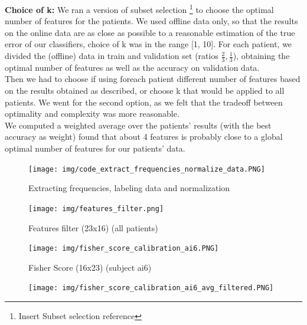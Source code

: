 \begin{itemize}
\textbf{Choice of k:} We ran a version of subset selection \footnote{Insert Subset selection reference} to choose the optimal number of features for the patients. We used offline data only, so that the results on the online data are as close as possible to a reasonable estimation of the true error of our classifiers, choice of k was in the range [1, 10]. For each patient, we divided the (offline) data in train and validation set (ratios $\frac{2}{3}, \frac{1}{3}$), obtaining the optimal number of features as well as the accuracy on validation data. \\
Then we had to choose if using foreach patient different number of features based on the results obtained as described, or choose k that would be applied to all patients. We went for the second option, as we felt that the tradeoff between optimality and complexity was more reasonable. \\
We computed a weighted average over the patients' results (with the best accuracy as weight) found that about 4 features is probably close to a global optimal number of features for our patients' data.

\begin{figure}[h!]
	\begin{center}
		 \texttt{[image: img/code\_extract\_frequencies\_normalize\_data.PNG]}
	\end{center}

	 \caption{Extracting frequencies, labeling data and normalization}
	 \label{fig:freq_data_norm}
\end{figure}


\begin{figure}[h!]
	\begin{center}
		 \texttt{[image: img/features\_filter.png]}
	\end{center}

	 \caption{Features filter (23x16) (all patients)}
	 \label{fig:features_filter}
\end{figure}

\begin{figure}[h!]
	\begin{center}
		 \texttt{[image: img/fisher\_score\_calibration\_ai6.PNG]}
	\end{center}

	 \caption{Fisher Score (16x23) (subject ai6)}
	 \label{fig:fisher_score_calibration_ai6}
\end{figure}

\begin{figure}[h!]
	\begin{center}
		 \texttt{[image: img/fisher\_score\_calibration\_ai6\_avg\_filtered.PNG]}
	\end{center}


\end{figure}
\end{itemize}
